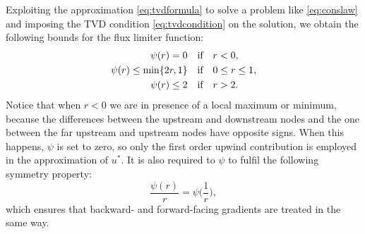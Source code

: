 Exploiting the approximation \eqref{eq:tvdformula} to solve a problem like
\eqref{eq:conslaw} and imposing the TVD condition \eqref{eq:tvdcondition} on 
the solution, we obtain the following bounds for the flux limiter function:
\begin{align}
\notag \psi(r) = 0 \quad &\text{if} \quad r < 0,\\
\psi(r) \leq \min \{2r, 1\} \quad &\text{if} \quad 0 \leq r \leq 1,\\
\notag \psi(r) \leq 2 \quad &\text{if} \quad r > 2.
\end{align}
Notice that when $r<0$ we are in presence of a local maximum or minimum, 
because the differences between the upstream and downstream nodes 
and the one between the far upstream and upstream nodes have opposite signs. 
When this happens, $\psi$ is set to zero, so only the first order upwind 
contribution is employed in the approximation of $u^*$.
It is also required to $\psi$ to fulfil the following symmetry property:
\begin{equation}
\frac{\psi(r)}{r} = \psi\bigg(\frac{1}{r}\bigg),
\end{equation}
which ensures that backward- and forward-facing gradients are treated in the 
same way.

